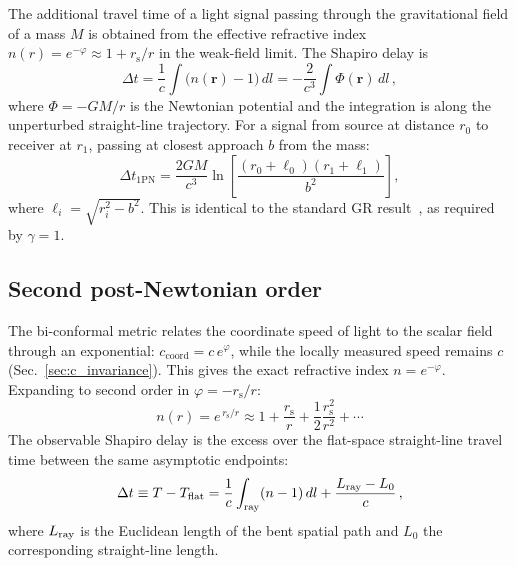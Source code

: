 \documentclass[aps,prd,onecolumn,superscriptaddress,nofootinbib,showpacs,12pt]{revtex4-2}
\newcommand{\rs}{r_{\mathrm{s}}}
\begin{document}
The additional travel time of a light signal passing through
the gravitational field of a mass $M$ is obtained from the
effective refractive index
$n(r) = e^{-\varphi} \approx 1 + \rs/r$ in the weak-field
limit.  The Shapiro delay is
\begin{equation}\label{eq:shapiro_general}
  \Delta t = \frac{1}{c}\int\bigl(n(\mathbf{r})-1\bigr)\,dl
           = -\frac{2}{c^{3}}\int\Phi(\mathbf{r})\,dl\,,
\end{equation}
where $\Phi = -GM/r$ is the Newtonian potential and the
integration is along the unperturbed straight-line trajectory.
For a signal from source at distance $r_{0}$ to receiver at
$r_{1}$, passing at closest approach $b$ from the mass:
\begin{equation}\label{eq:shapiro_1pn}
  \Delta t_{\mathrm{1PN}} = \frac{2GM}{c^{3}}
    \ln\!\left[\frac{(r_{0}+\ell_{0})(r_{1}+\ell_{1})}{b^{2}}
    \right],
\end{equation}
where $\ell_{i} = \sqrt{r_{i}^{2}-b^{2}}$.  This is identical
to the standard GR result~\cite{Shapiro1964}, as required by
$\gamma = 1$.

\subsection{Second post-Newtonian order}\label{sec:shapiro_2pn}

The bi-conformal metric relates the coordinate speed of light to
the scalar field through an exponential:
$c_{\mathrm{coord}} = c\,e^{\varphi}$, while the locally measured
speed remains $c$ (Sec.~\ref{sec:c_invariance}).  This gives the exact
refractive index $n = e^{-\varphi}$.  Expanding to second
order in $\varphi = -\rs/r$:
\begin{equation}\label{eq:n_2pn}
  n(r) = e^{\,\rs/r} \approx 1 + \frac{\rs}{r}
         + \frac{1}{2}\frac{\rs^{2}}{r^{2}} + \cdots
\end{equation}
The observable Shapiro delay is the excess over the
flat-space straight-line travel time between the same
asymptotic endpoints:
\begin{equation}\label{eq:shapiro_split}
  \Delta t \equiv T - T_{\mathrm{flat}}
  = \frac{1}{c}\int_{\rm ray}(n-1)\,dl
    + \frac{L_{\rm ray}-L_{0}}{c}\,,
\end{equation}
where $L_{\rm ray}$ is the Euclidean length of the bent
spatial path and $L_{0}$ the corresponding straight-line
length.
\end{document}
